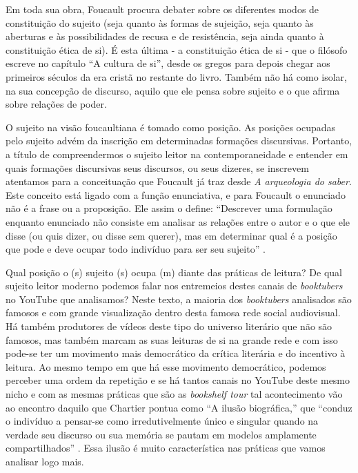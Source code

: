 Em toda sua obra, Foucault procura debater sobre os diferentes modos de
constituição do sujeito (seja quanto às formas de sujeição, seja quanto
às aberturas e às possibilidades de recusa e de resistência, seja ainda
quanto à constituição ética de si). É esta última - a constituição ética
de si - que o filósofo escreve no capítulo \enquote{A cultura de si}, desde os
gregos para depois chegar aos primeiros séculos da era cristã no
restante do livro. Também não há como isolar, na sua concepção de
discurso, aquilo que ele pensa sobre sujeito e o que afirma sobre
relações de poder.

O sujeito na visão foucaultiana é tomado como posição. As posições
ocupadas pelo sujeito advém da inscrição em determinadas formações
discursivas. Portanto, a título de compreendermos o sujeito leitor na
contemporaneidade e entender em quais formações discursivas seus
discursos, ou seus dizeres, se inscrevem atentamos para a conceituação
que Foucault já traz desde \textit{A arqueologia do saber}. Este conceito
está ligado com a função enunciativa, e para Foucault o enunciado não é
a frase ou a proposição. Ele assim o define: \enquote{Descrever uma formulação
enquanto enunciado não consiste em analisar as relações entre o autor e
o que ele disse (ou quis dizer, ou disse sem querer), mas em determinar
qual é a posição que pode e deve ocupar todo indivíduo para ser seu
sujeito} \cite[p. 108]{foucault2009arqueologia}.

Qual posição o (s) sujeito (s) ocupa (m) diante das práticas de leitura?
De qual sujeito leitor moderno podemos falar nos entremeios destes
canais de \textit{booktubers} no YouTube que analisamos? Neste texto, a
maioria dos \textit{booktubers} analisados são famosos e com grande
visualização dentro desta famosa rede social audiovisual. Há também
produtores de vídeos deste tipo do universo literário que não são
famosos, mas também marcam as suas leituras de si na grande rede e com
isso pode-se ter um movimento mais democrático da crítica literária e do
incentivo à leitura. Ao mesmo tempo em que há esse movimento
democrático, podemos perceber uma ordem da repetição e se há tantos
canais no YouTube deste mesmo nicho e com as mesmas práticas que são as
\textit{bookshelf tour} tal acontecimento vão ao encontro daquilo que
Chartier pontua como \enquote{A ilusão biográfica,} que \enquote{conduz o indivíduo a pensar-se como irredutivelmente único e singular quando na verdade seu discurso ou sua memória se pautam em modelos amplamente compartilhados}
\cite[p. 8]{chartier2019lersem}. Essa ilusão é muito característica nas práticas
que vamos analisar logo mais.

